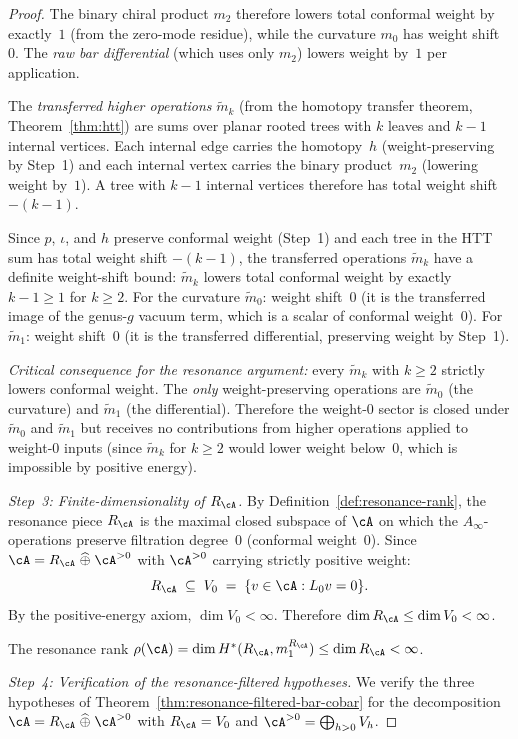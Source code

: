 \begin{proof}
The binary chiral product $m_2$ therefore lowers total
conformal weight by exactly~$1$ (from the zero-mode
residue), while the curvature $m_0$ has weight shift~$0$.
The \emph{raw bar differential} (which uses only $m_2$)
lowers weight by~$1$ per application.

The \emph{transferred higher operations} $\tilde{m}_k$
(from the homotopy transfer theorem,
Theorem~\ref{thm:htt}) are sums over planar rooted trees
with $k$ leaves and $k - 1$ internal vertices.  Each internal
edge carries the homotopy~$h$ (weight-preserving by
Step~1) and each internal vertex carries the binary product~$m_2$
(lowering weight by~$1$).  A tree with $k - 1$ internal
vertices therefore has total weight shift $-(k-1)$.

Since $p$, $\iota$, and $h$ preserve conformal weight
(Step~1) and each tree in the HTT sum has total weight
shift $-(k-1)$, the transferred operations $\tilde{m}_k$
have a definite weight-shift bound:
$\tilde{m}_k$ lowers total conformal weight by
exactly $k - 1 \ge 1$ for $k \ge 2$.  For the curvature
$\tilde{m}_0$: weight shift~$0$ (it is the transferred
image of the genus-$g$ vacuum term, which is a scalar of
conformal weight~$0$).  For $\tilde{m}_1$: weight
shift~$0$ (it is the transferred differential, preserving
weight by Step~1).

\emph{Critical consequence for the resonance argument:}
every $\tilde{m}_k$ with $k \ge 2$ strictly lowers
conformal weight.  The \emph{only} weight-preserving operations are
$\tilde{m}_0$ (the curvature) and $\tilde{m}_1$ (the
differential).  Therefore the weight-$0$ sector is closed
under $\tilde{m}_0$ and $\tilde{m}_1$ but receives no
contributions from higher operations applied to
weight-$0$ inputs (since $\tilde{m}_k$ for $k \ge 2$
would lower weight below~$0$, which is impossible by
positive energy).

\emph{Step~3: Finite-dimensionality of $R_\cA$.}
By Definition~\ref{def:resonance-rank}, the resonance piece
$R_\cA$ is the maximal closed subspace of $\cA$ on which the
$A_\infty$-operations preserve filtration degree~$0$
(conformal weight~$0$).  Since $\cA = R_\cA \;\widehat{\oplus}\;
\cA^{>0}$ with $\cA^{>0}$ carrying strictly positive weight:
\[
R_\cA \;\subseteq\; V_0
\;=\; \{v \in \cA : L_0 v = 0\}.
\]
By the positive-energy axiom, $\dim V_0 < \infty$.  Therefore
$\dim R_\cA \le \dim V_0 < \infty$.

The resonance rank $\rho(\cA) = \dim H^*(R_\cA, m_1^{R_\cA})
\le \dim R_\cA < \infty$.

\emph{Step~4: Verification of the resonance-filtered hypotheses.}
We verify the three hypotheses of
Theorem~\ref{thm:resonance-filtered-bar-cobar} for the
decomposition $\cA = R_\cA \;\widehat{\oplus}\; \cA^{>0}$
with $R_\cA = V_0$ and $\cA^{>0} = \bigoplus_{h > 0} V_h$.


\end{proof}
